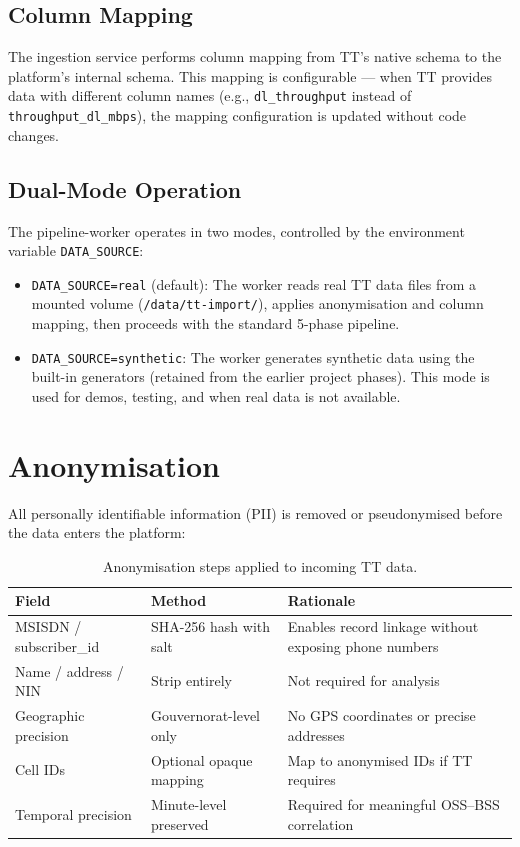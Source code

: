 \subsection{Column Mapping}

The ingestion service performs column mapping from TT's native schema to the platform's internal schema. This mapping is configurable --- when TT provides data with different column names (e.g., \texttt{dl\_throughput} instead of \texttt{throughput\_dl\_mbps}), the mapping configuration is updated without code changes.

\subsection{Dual-Mode Operation}

The pipeline-worker operates in two modes, controlled by the environment variable \texttt{DATA\_SOURCE}:

\begin{itemize}
  \item \texttt{DATA\_SOURCE=real} (default): The worker reads real TT data files from a mounted volume (\texttt{/data/tt-import/}), applies anonymisation and column mapping, then proceeds with the standard 5-phase pipeline.
  \item \texttt{DATA\_SOURCE=synthetic}: The worker generates synthetic data using the built-in generators (retained from the earlier project phases). This mode is used for demos, testing, and when real data is not available.
\end{itemize}

\section{Anonymisation}

All personally identifiable information (PII) is removed or pseudonymised before the data enters the platform:

\begin{table}[H]
\centering
\caption{Anonymisation steps applied to incoming TT data.}
\label{tab:anonymisation}
\begin{tabularx}{\textwidth}{@{}llX@{}}
\toprule
\textbf{Field} & \textbf{Method} & \textbf{Rationale} \\
\midrule
MSISDN / subscriber\_id & SHA-256 hash with salt & Enables record linkage without exposing phone numbers \\
Name / address / NIN     & Strip entirely & Not required for analysis \\
Geographic precision     & Gouvernorat-level only & No GPS coordinates or precise addresses \\
Cell IDs                 & Optional opaque mapping & Map to anonymised IDs if TT requires \\
Temporal precision       & Minute-level preserved & Required for meaningful OSS--BSS correlation \\
\bottomrule
\end{tabularx}
\end{table}

